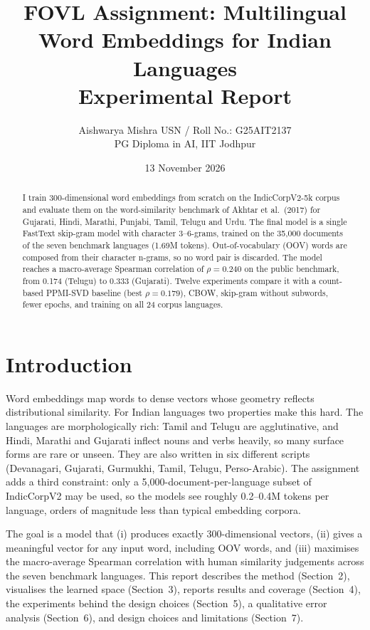 \documentclass[11pt,a4paper]{article}
\title{\textbf{FOVL Assignment: Multilingual Word Embeddings for Indian Languages}\\[2pt]\large Experimental Report}
\author{Aishwarya Mishra \quad USN / Roll No.: G25AIT2137\\ PG Diploma in AI, IIT Jodhpur}
\date{13 November 2026}
\begin{document}
\maketitle
\vspace{-6pt}
\begin{abstract}
I train 300-dimensional word embeddings from scratch on the IndicCorpV2-5k corpus and evaluate them on the word-similarity benchmark of Akhtar et al.\ (2017) for Gujarati, Hindi, Marathi, Punjabi, Tamil, Telugu and Urdu. The final model is a single FastText skip-gram model with character 3--6-grams, trained on the 35{,}000 documents of the seven benchmark languages (1.69M tokens). Out-of-vocabulary (OOV) words are composed from their character n-grams, so no word pair is discarded. The model reaches a macro-average Spearman correlation of $\rho = 0.240$ on the public benchmark, from 0.174 (Telugu) to 0.333 (Gujarati). Twelve experiments compare it with a count-based PPMI-SVD baseline (best $\rho = 0.179$), CBOW, skip-gram without subwords, fewer epochs, and training on all 24 corpus languages.
\end{abstract}

\section{Introduction}
Word embeddings map words to dense vectors whose geometry reflects distributional similarity. For Indian languages two properties make this hard. The languages are morphologically rich: Tamil and Telugu are agglutinative, and Hindi, Marathi and Gujarati inflect nouns and verbs heavily, so many surface forms are rare or unseen. They are also written in six different scripts (Devanagari, Gujarati, Gurmukhi, Tamil, Telugu, Perso-Arabic). The assignment adds a third constraint: only a 5{,}000-document-per-language subset of IndicCorpV2 may be used, so the models see roughly 0.2--0.4M tokens per language, orders of magnitude less than typical embedding corpora.

The goal is a model that (i) produces exactly 300-dimensional vectors, (ii) gives a meaningful vector for any input word, including OOV words, and (iii) maximises the macro-average Spearman correlation with human similarity judgements across the seven benchmark languages. This report describes the method (Section~2), visualises the learned space (Section~3), reports results and coverage (Section~4), the experiments behind the design choices (Section~5), a qualitative error analysis (Section~6), and design choices and limitations (Section~7).
\end{document}
